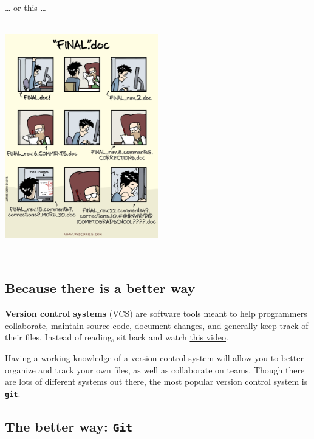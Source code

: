 \documentclass[
]{book}
\begin{document}
~

\ldots{} or this \ldots{}

~\\

\includegraphics[width=0.5\textwidth,height=\textheight]{img/version_control_2.png}

~

\hypertarget{because-there-is-a-better-way}{%
\subsection*{Because there is a better way}\label{because-there-is-a-better-way}}

\textbf{Version control systems} (VCS) are software tools meant to help programmers collaborate, maintain source code, document changes, and generally keep track of their files. Instead of reading, sit back and watch \href{https://youtu.be/9GKpbI1siow}{this video}.

Having a working knowledge of a version control system will allow you to better organize and track your own files, as well as collaborate on teams. Though there are lots of different systems out there, the most popular version control system is \textbf{\texttt{git}}.

\hypertarget{the-better-way-git}{%
\subsection*{\texorpdfstring{The better way: \texttt{Git}}{The better way: Git}}\label{the-better-way-git}}
\end{document}
